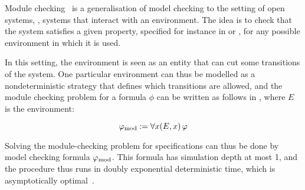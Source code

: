 Module checking~\cite{kupferman2001module} is a generalisation of model checking to the setting
of open systems, \ie, systems that interact with an environment. The
idea is to check that the system satisfies a given property, specified
for instance in \LTL or \CTLs, for any possible environment in which
it is used.

In this setting, the environment is seen as an entity that can cut
some transitions of the system. One particular environment can thus be
modelled as a nondeterministic strategy that defines which transitions
are allowed, and the module checking problem for a \CTLs formula $\phi$ can
be written as follows in \SLref, where $E$ is the environment:

\[\varphi_{\text{mod}}:=\forall x (E,x) \,\varphi\]

Solving the module-checking problem for \CTLs specifications can thus
be done by model checking formula $\varphi_{\text{mod}}$. This formula has
simulation depth at most 1, and the procedure thus runs  in 
doubly exponential deterministic time, which is asymptotically optimal~\cite{kupferman2001module}.

